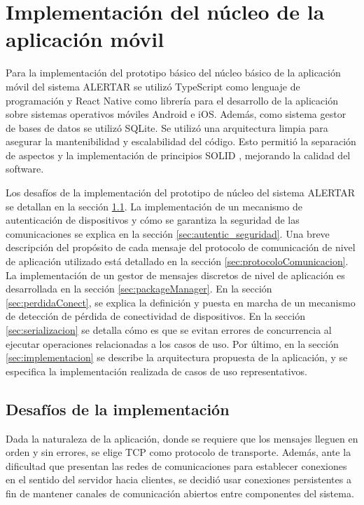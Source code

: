 \chapter{Implementación del núcleo de la aplicación móvil}\label{cap:implementacion}
Para la implementación del prototipo básico del núcleo básico de la aplicación móvil del sistema ALERTAR se utilizó TypeScript como lenguaje de programación y React Native como librería para el desarrollo de la aplicación sobre sistemas operativos móviles Android e iOS. Además, como sistema gestor de bases de datos se utilizó SQLite. Se utilizó una arquitectura limpia para asegurar la mantenibilidad y escalabilidad del código. Esto permitió la separación de aspectos y la implementación de principios SOLID \cite{martin2003agile}, mejorando la calidad del software.

Los desafíos de la implementación del prototipo de núcleo del sistema ALERTAR se detallan en la sección \ref{sec:desafiosImpl}. La implementación de un mecanismo de autenticación de dispositivos y cómo se garantiza la seguridad de las comunicaciones se explica en la sección \ref{sec:autentic_seguridad}. Una breve descripción del propósito de cada mensaje del protocolo de comunicación de nivel de aplicación utilizado está detallado en la sección \ref{sec:protocoloComunicacion}. La implementación de un gestor de mensajes discretos de nivel de aplicación es desarrollada en la sección \ref{sec:packageManager}. En la sección \ref{sec:perdidaConect}, se explica la definición y puesta en marcha de un mecanismo de detección de pérdida de conectividad de dispositivos. En la sección \ref{sec:serializacion} se detalla cómo es que se evitan errores de concurrencia al ejecutar operaciones relacionadas a los casos de uso. Por último, en la sección \ref{sec:implementacion} se describe la arquitectura propuesta de la aplicación, y se especifica la implementación realizada de casos de uso representativos.

\section{Desafíos de la implementación}

\label{sec:desafiosImpl}
Dada la naturaleza de la aplicación, donde se requiere que los mensajes lleguen en orden y sin errores, se elige TCP como protocolo de transporte. Además, ante la dificultad que presentan las redes de comunicaciones para establecer conexiones en el sentido del servidor hacia clientes, se decidió usar conexiones persistentes a fin de mantener canales de comunicación abiertos entre componentes del sistema.

